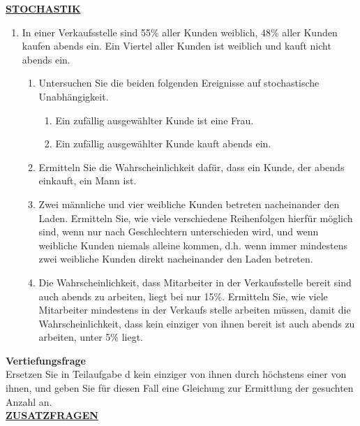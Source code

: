 \documentclass[a4paper,12pt]{article}
\begin{document}
\underline{\textbf{STOCHASTIK}}\\
\begin{enumerate}
  \item In einer Verkaufsstelle sind 55\% aller Kunden weiblich, 48\% aller Kunden kaufen abends ein. Ein Viertel aller Kunden ist weiblich und kauft nicht abends ein.\\
  \begin{enumerate}[label={\alph*)}]
    \item Untersuchen Sie die beiden folgenden Ereignisse auf stochastische Unabhängigkeit.
    \begin{enumerate}[label={\Alph*:}]
      \item \glqq Ein zufällig ausgewählter Kunde ist eine Frau.\grqq
      \item \glqq Ein zufällig ausgewählter Kunde kauft abends ein.\grqq
    \end{enumerate}
    
    \item Ermitteln Sie die Wahrscheinlichkeit dafür, dass ein Kunde, der abends einkauft, ein Mann ist.

    \item Zwei männliche und vier weibliche Kunden betreten nacheinander den Laden. Ermitteln Sie, wie viele verschiedene Reihenfolgen hierfür möglich sind, wenn nur nach Geschlechtern unterschieden wird, und wenn weibliche Kunden niemals alleine kommen, d.h. wenn immer mindestens zwei weibliche Kunden direkt nacheinander den Laden betreten.

    \item Die Wahrscheinlichkeit, dass Mitarbeiter in der Verkaufsstelle bereit sind auch abends zu arbeiten, liegt bei nur 15\%. Ermitteln Sie, wie viele Mitarbeiter mindestens in der Verkaufs stelle arbeiten müssen, damit die Wahrscheinlichkeit, dass kein einziger von ihnen bereit ist auch abends zu arbeiten, unter 5\% liegt.
  \end{enumerate}
\end{enumerate}

\textbf{Vertiefungsfrage}\\
Ersetzen Sie in Teilaufgabe d \glqq kein einziger von ihnen\grqq{} durch \glqq höchstens einer von ihnen\grqq{}, und geben Sie für diesen Fall eine Gleichung zur Ermittlung der gesuchten Anzahl an.\\

\underline{\textbf{ZUSATZFRAGEN}}\\
\end{document}

